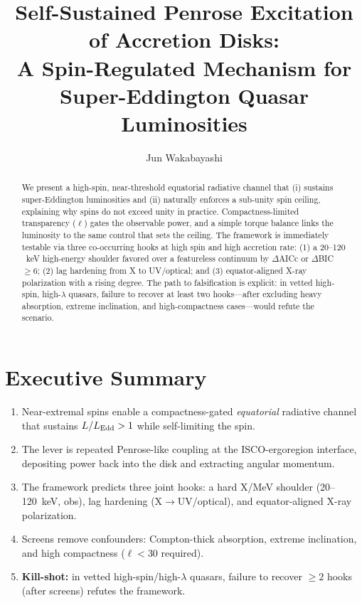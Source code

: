 \documentclass[twocolumn]{aastex701}
\newcommand{\ellcrit}{30}
\newcommand{\ellhard}{\ell<\ellcrit}         %
\newenvironment{tenumerate}{%
  \begin{enumerate}\setlength{\itemsep}{0pt}\setlength{\parsep}{0pt}\setlength{\parskip}{0pt}%
}{\end{enumerate}}
\begin{document}
\title{Self-Sustained Penrose Excitation of Accretion Disks:\\
A Spin-Regulated Mechanism for Super-Eddington Quasar Luminosities}

\author[0009-0008-1891-4579]{Jun Wakabayashi}

\begin{abstract}
We present a high-spin, near-threshold equatorial radiative channel that (i) sustains super-Eddington luminosities and (ii) naturally enforces a sub-unity spin ceiling, explaining why spins do not exceed unity in practice. Compactness-limited transparency ($\ell$) gates the observable power, and a simple torque balance links the luminosity to the same control that sets the ceiling. The framework is immediately testable via three co-occurring hooks at high spin and high accretion rate: (1) a 20--120 ~keV high-energy shoulder favored over a featureless continuum by $\Delta$AICc or $\Delta$BIC $\ge 6$; (2) lag hardening from X to UV/optical; and (3) equator-aligned X-ray polarization with a rising degree. The path to falsification is explicit: in vetted high-spin, high-$\lambda$ quasars, failure to recover at least two hooks---after excluding heavy absorption, extreme inclination, and high-compactness cases---would refute the scenario.
\end{abstract}


\section*{Executive Summary}
\begin{tenumerate}
  \item Near-extremal spins enable a compactness-gated \emph{equatorial} radiative channel that sustains $L/L_{\rm Edd}>1$ while self-limiting the spin.
  \item The lever is repeated Penrose-like coupling at the ISCO-ergoregion interface, depositing power back into the disk and extracting angular momentum.
  \item The framework predicts three joint hooks: a hard X/MeV shoulder (20--120~keV, obs), lag hardening (X$\to$UV/optical), and equator-aligned X-ray polarization.
  \item Screens remove confounders: Compton-thick absorption, extreme inclination, and high compactness ($\ellhard$ required).
  \item \textbf{Kill-shot:} in vetted high-spin/high-$\lambda$ quasars, failure to recover $\ge\!2$ hooks (after screens) refutes the framework.
\end{tenumerate}
\end{document}
